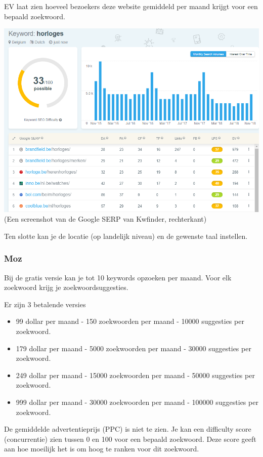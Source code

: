 EV laat zien hoeveel bezoekers deze website gemiddeld per maand krijgt voor een bepaald zoekwoord. 

\includegraphics[width=\linewidth]{Bachelorproef/bachelor/img/kwfinderrechts.PNG}
(Een screenshot van de Google SERP van Kwfinder, rechterkant)

Ten slotte kan je de locatie (op landelijk niveau) en de gewenste taal instellen.

\subsubsection{Moz}
\label{ch: Moz}

Bij de gratis versie kan je tot 10 keywords opzoeken per maand. Voor elk zoekwoord krijg je zoekwoordsuggesties.

Er zijn 3 betalende versies 

\begin{itemize}
\item 99 dollar per maand - 150 zoekwoorden per maand - 10000 suggesties per zoekwoord.
\item 179 dollar per maand - 5000 zoekwoorden per maand - 30000 suggesties per zoekwoord.
\item 249 dollar per maand - 15000 zoekwoorden per maand - 50000 suggesties per zoekwoord.
\item 999 dollar per maand - 30000 zoekwoorden per maand - 100000 suggesties per zoekwoord.
\end{itemize}

De gemiddelde advertentieprijs (PPC) is niet te zien. Je kan een difficulty score (concurrentie) zien tussen 0 en 100 voor een bepaald zoekwoord. Deze score geeft aan hoe moeilijk het is om hoog te ranken voor dit zoekwoord. 

